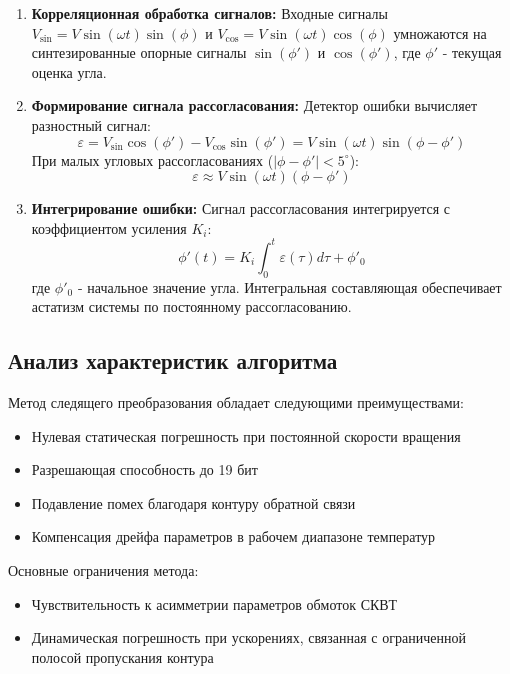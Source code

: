 \begin{enumerate}
    \item \textbf{Корреляционная обработка сигналов:}
    Входные сигналы $V_{\sin} = V \sin(\omega t) \sin(\phi)$ и $V_{\cos} = V \sin(\omega t) \cos(\phi)$ умножаются на синтезированные опорные сигналы $\sin(\phi')$ и $\cos(\phi')$, где $\phi'$ - текущая оценка угла.
    
    \item \textbf{Формирование сигнала рассогласования:}
    Детектор ошибки вычисляет разностный сигнал:
    \begin{equation}
        \varepsilon = V_{\sin} \cos(\phi') - V_{\cos} \sin(\phi') = V \sin(\omega t) \sin(\phi - \phi')
        \label{eq:error}
    \end{equation}
    При малых угловых рассогласованиях ($|\phi - \phi'| < 5^\circ$):
    \begin{equation}
        \varepsilon \approx V \sin(\omega t) (\phi - \phi')
        \label{eq:error_approx}
    \end{equation}
    
    \item \textbf{Интегрирование ошибки:}
    Сигнал рассогласования интегрируется с коэффициентом усиления $K_i$:
    \begin{equation}
        \phi'(t) = K_i \int_0^t \varepsilon(\tau) d\tau + \phi'_0
        \label{eq:integration}
    \end{equation}
    где $\phi'_0$ - начальное значение угла. Интегральная составляющая обеспечивает астатизм системы по постоянному рассогласованию.
\end{enumerate}

\subsection{Анализ характеристик алгоритма}
Метод следящего преобразования обладает следующими преимуществами:
\begin{itemize}
    \item Нулевая статическая погрешность при постоянной скорости вращения
    \item Разрешающая способность до 19 бит
    \item Подавление помех благодаря контуру обратной связи
    \item Компенсация дрейфа параметров в рабочем диапазоне температур
\end{itemize}

Основные ограничения метода:
\begin{itemize}
    \item Чувствительность к асимметрии параметров обмоток СКВТ 
    \item Динамическая погрешность при ускорениях, связанная с ограниченной полосой пропускания контура \cite{Anufriev2014}
\end{itemize}



